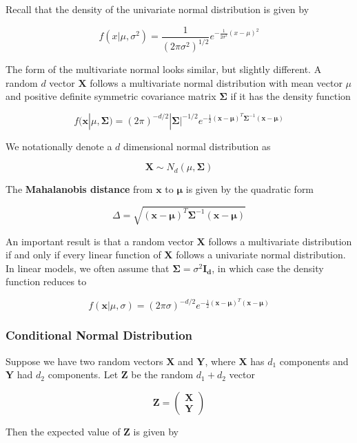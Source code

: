 \documentclass[11pt]{article}
\theoremstyle{definition}
\begin{document}
Recall that the density of the univariate normal distribution is given by 

$$f(x|\mu, \sigma^2) = \frac{1}{(2\pi\sigma^2)^{1/2}} e^{-
\frac{1}{2\sigma^2} (x - \mu)^2}$$

The form of the multivariate normal looks similar, but slightly different.  A random $d$ vector $\mathbf{X}$ follows a multivariate normal distribution with mean vector $\mu$ and positive definite symmetric covariance matrix $\mathbf{\Sigma}$ if it has the density function

$$f(\mathbf{x}|\mu, \mathbf{\Sigma}) = (2\pi)^{-d/2}|\mathbf{\Sigma}|^{-1/2} e^{-\frac{1}{2} (\mathbf{x} - \mathbf{\mu})^T \mathbf{\Sigma}^{-1}(\mathbf{x} - \mathbf{\mu})}$$

We notationally denote a $d$ dimensional normal distribution as 

$$\mathbf{X} \sim N_d(\mu, \mathbf{\Sigma})$$

The \textbf{Mahalanobis distance} from $\mathbf{x}$ to $\mathbf{\mu}$ is given by the quadratic form

$$\Delta = \sqrt{(\mathbf{x} - \mathbf{\mu})^T \mathbf{\Sigma}^{-1}(\mathbf{x} - \mathbf{\mu})}$$

An important result is that a random vector $\mathbf{X}$ follows a multivariate distribution if and only if every linear function of $\mathbf{X}$ follows a univariate normal distribution.\\

In linear models, we often assume that $\mathbf{\Sigma} = \sigma^2\mathbf{I_d}$, in which case the density function reduces to

$$f(\mathbf{x}|\mu, \sigma) = (2\pi \sigma)^{-d/2} e^{-\frac{1}{2} (\mathbf{x} - \mathbf{\mu})^T (\mathbf{x} - \mathbf{\mu})}$$

\subsubsection{Conditional Normal Distribution}
Suppose we have two random vectors $\mathbf{X}$ and $\mathbf{Y}$, where $\mathbf{X}$ has $d_1$ components and $\mathbf{Y}$ had $d_2$ components.  Let $\mathbf{Z}$ be the random $d_1 + d_2$ vector

$$\mathbf{Z} = \begin{pmatrix} \mathbf{X} \\ \mathbf{Y} \end{pmatrix}$$

Then the expected value of $\mathbf{Z}$ is given by 
\end{document}
